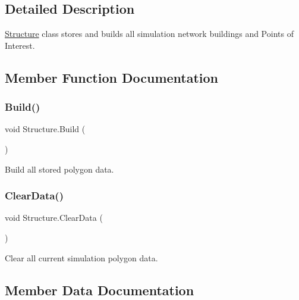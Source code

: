 \subsection{Detailed Description}
\mbox{\hyperlink{class_structure}{Structure}} class stores and builds all simulation network buildings and Points of Interest. 



\subsection{Member Function Documentation}
\mbox{\label{class_structure_a8603f9a973205d3dcaf81710fa79158d}} 
\subsubsection{\texorpdfstring{Build()}{Build()}}
{\footnotesize\ttfamily void Structure.\+Build (\begin{DoxyParamCaption}{ }\end{DoxyParamCaption})}



Build all stored polygon data. 

\mbox{\label{class_structure_a403435d05e2eec3c6ede0d842ad67b53}} 
\subsubsection{\texorpdfstring{ClearData()}{ClearData()}}
{\footnotesize\ttfamily void Structure.\+Clear\+Data (\begin{DoxyParamCaption}{ }\end{DoxyParamCaption})}



Clear all current simulation polygon data. 



\subsection{Member Data Documentation}
\mbox{\label{class_structure_aa06a0148d5f248e9a906266898dc79d4}} 
